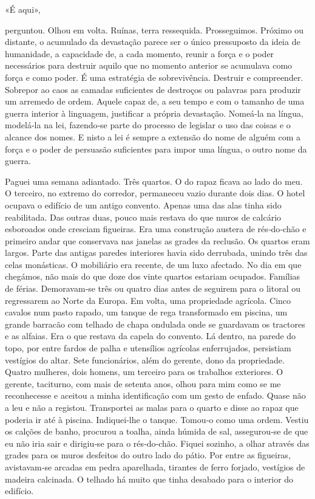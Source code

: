 «É aqui»,

perguntou. Olhou em volta. Ruínas, terra ressequida. Prosseguimos.
Próximo ou distante, o acumulado da devastação parece ser o único
pressuposto da ideia de humanidade, a capacidade de, a cada momento,
reunir a força e o poder necessários para destruir aquilo que no momento
anterior se acumulava como força e como poder. É uma estratégia de
sobrevivência. Destruir e compreender. Sobrepor ao caos as camadas
suficientes de destroços ou palavras para produzir um arremedo de ordem.
Aquele capaz de, a seu tempo e com o tamanho de uma guerra interior à
linguagem, justificar a própria devastação. Nomeá­‑la na língua,
modelá­‑la na lei, fazendo­‑se parte do processo de legislar o uso das
coisas e o alcance dos nomes. E nisto a lei é sempre a extensão do nome
de alguém com a força e o poder de persuasão suficientes para impor uma
língua, o outro nome da guerra.

Paguei uma semana adiantado. Três quartos. O do rapaz ficava ao lado do
meu. O terceiro, no extremo do corredor, permaneceu vazio durante dois
dias. O hotel ocupava o edifício de um antigo convento. Apenas uma das
alas tinha sido reabilitada. Das outras duas, pouco mais restava do que
muros de calcário esboroados onde cresciam figueiras. Era uma construção
austera de rés­‑do­‑chão e primeiro andar que conservava nas janelas as
grades da reclusão. Os quartos eram largos. Parte das antigas paredes
interiores havia sido derrubada, unindo três das celas monásticas. O
mobiliário era recente, de um luxo afectado. No dia em que chegámos, não
mais do que doze dos vinte quartos estariam ocupados. Famílias de
férias. Demoravam­‑se três ou quatro dias antes de seguirem para o
litoral ou regressarem ao Norte da Europa. Em volta, uma propriedade
agrícola. Cinco cavalos num pasto rapado, um tanque de rega transformado
em piscina, um grande barracão com telhado de chapa ondulada onde se
guardavam os tractores e as alfaias. Era o que restava da capela do
convento. Lá dentro, na parede do topo, por entre fardos de palha e
utensílios agrícolas enferrujados, persistiam vestígios do altar. Sete
funcionários, além do gerente, dono da propriedade. Quatro mulheres,
dois homens, um terceiro para os trabalhos exteriores. O gerente,
taciturno, com mais de setenta anos, olhou para mim como se me
reconhecesse e aceitou a minha identificação com um gesto de enfado.
Quase não a leu e não a registou. Transportei as malas para o quarto e
disse ao rapaz que poderia ir até à piscina. Indiquei­‑lhe o tanque.
Tomou­‑o como uma ordem. Vestiu os calções de banho, procurou a toalha,
ainda húmida de sal, assegurou­‑se de que eu não iria sair e dirigiu­‑se
para o rés­‑do­‑chão. Fiquei sozinho, a olhar através das grades para os
muros desfeitos do outro lado do pátio. Por entre as figueiras,
avistavam­‑se arcadas em pedra aparelhada, tirantes de ferro forjado,
vestígios de madeira calcinada. O telhado há muito que tinha desabado
para o interior do edifício.

